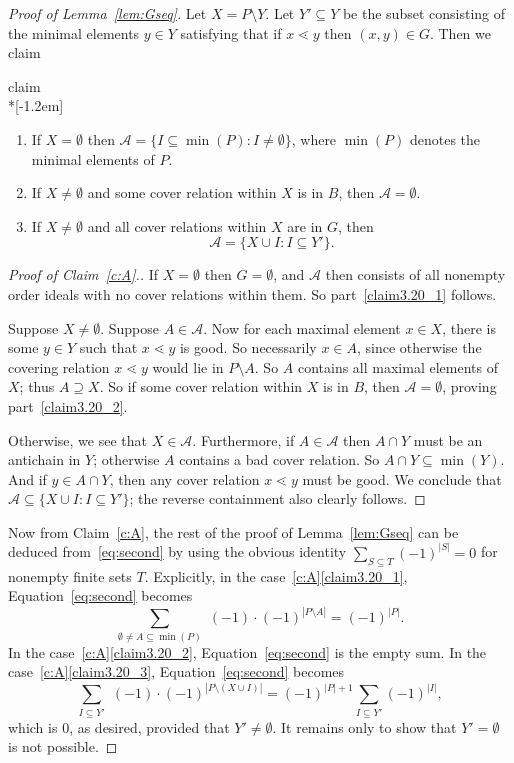 \begin{proof}[Proof of Lemma~\ref{lem:Gseq}]
Let $X = P\setminus Y$. Let $Y'\subseteq Y$ be the subset consisting of the minimal elements $y\in Y$ satisfying that if $x\lessdot y$ then $(x,y)\in G$. 
Then we claim 
\begin{enonce}{claim}\label{c:A}\ \\*[-1.2em]
\begin{enumerate}
\item\label{claim3.20_1} If $X = \emptyset$ then $\mathcal{A} = \{I \subseteq \min(P): I\ne \emptyset\}$, where $\min(P)$ denotes the minimal elements of $P$.
\item\label{claim3.20_2} If $X\ne \emptyset$ and some cover relation within $X$ is in $B$, then $\mathcal{A}=\emptyset$.
\item\label{claim3.20_3} If $X\ne \emptyset$ and all cover relations within $X$ are in $G$, then
\[
\mathcal{A} = \{X\cup I: I\subseteq Y'\}.
\]
\end{enumerate}
\end{enonce}


\begin{proof}[Proof of Claim~\ref{c:A}.] If $X=\emptyset$ then $G=\emptyset$, and $\mathcal{A}$ then consists of all nonempty order ideals with no cover relations within them. So part~\eqref{claim3.20_1} follows.

Suppose $X\ne \emptyset$. Suppose $A\in \mathcal{A}$. Now for each maximal element $x\in X$, there is some $y\in Y$ such that $x\lessdot y$ is good. So necessarily $x\in A$, since otherwise the covering relation $x\lessdot y$ would lie in $P\setminus A$. So $A$ contains all maximal elements of $X$; thus $A\supseteq X$. So if some cover relation within $X$ is in $B$, then $\mathcal{A}=\emptyset$, proving part~\eqref{claim3.20_2}. 

Otherwise, we see that $X\in\mathcal{A}$. Furthermore, if $A\in\mathcal{A}$ then $A\cap Y$ must be an antichain in $Y$; otherwise $A$ contains a bad cover relation. So $A\cap Y\subseteq \min(Y)$. And if $y\in A\cap Y$, then any cover relation $x\lessdot y$ must be good. We conclude that $\mathcal{A} \subseteq \{X\cup I: I\subseteq Y'\}$; the reverse containment also clearly follows.
\end{proof}

Now from Claim~\ref{c:A}, the rest of the proof of Lemma~\ref{lem:Gseq} can be deduced from~\eqref{eq:second} by using the obvious identity 
$\sum_{S\subseteq T} (-1)^{|S|} = 0$
for nonempty finite sets $T$. Explicitly, in the case~\ref{c:A}\eqref{claim3.20_1}, Equation~\eqref{eq:second} becomes 
\[
\sum_{\emptyset\ne A \subseteq \min(P)} \,\,(-1)\cdot(-1)^{|P\setminus A|} = (-1)^{|P|}.
\]
In the case~\ref{c:A}\eqref{claim3.20_2}, Equation~\eqref{eq:second} is the empty sum. 
In the case~\ref{c:A}\eqref{claim3.20_3}, Equation~\eqref{eq:second} becomes
\[
\sum_{I\subseteq Y'} \,\,(-1)\cdot(-1)^{|P\setminus(X \cup I)|} = (-1)^{|P|+1}\sum_{I\subseteq Y'} (-1)^{|I|},
\]
which is $0$, as desired, provided that $Y'\ne \emptyset$. It remains only to show that $Y'=\emptyset$ is not possible.


\end{proof}

